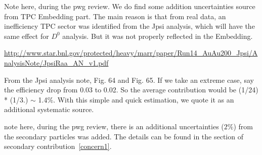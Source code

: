 Note here, during the pwg review. We do find some addition uncertainties source from TPC Embedding part. The main reason is that from real data, an inefficiency TPC sector was identified from the Jpsi analysis, which will have the same effect for $D^0$ analysis. But it was not properly reflected in the Embedding. 

\url{http://www.star.bnl.gov/protected/heavy/marr/paper/Run14_AuAu200_Jpsi/AnalysisNote/JpsiRaa_AN_v1.pdf}

From the Jpsi analysis note, Fig. 64 and Fig. 65. If we take an extreme case, say the efficiency drop from 0.03 to 0.02. So the average contribution would be (1/24) * (1/3.) $\sim$ 1.4\%. With this simple and quick estimation, we quote it as an additional systematic source.

note here, during the pwg review, there is an additional uncertainties ($2\%$) from the secondary particles was added. The details can be found in the section of secondary contribution~\ref{concern1}.

